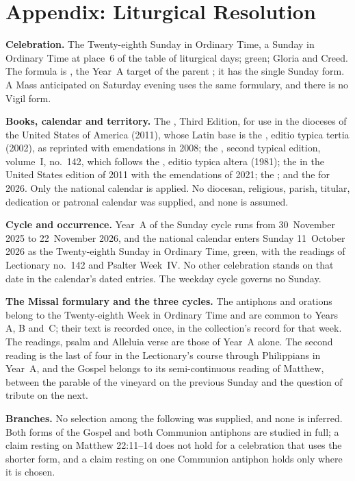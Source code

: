 \section{Appendix: Liturgical Resolution}
\label{sec:liturgical-resolution}

{\small
\textbf{Celebration.} The Twenty-eighth Sunday in Ordinary Time, a Sunday in
Ordinary Time at place~6 of the table of liturgical days; green; Gloria and
Creed. The formula is , the Year~A target of the parent
; it has the single Sunday form. A Mass anticipated on Saturday
evening uses the same formulary, and there is no Vigil form.

\textbf{Books, calendar and territory.} The , Third
Edition, for use in the dioceses of the United States of America (2011), whose
Latin base is the , editio typica tertia (2002), as
reprinted with emendations in 2008; the , second typical edition,
volume~I, no.~142, which follows the , editio
typica altera (1981); the  in the
United States edition of 2011 with the emendations of 2021; the
; and the
 for
2026. Only the national calendar is applied. No diocesan, religious, parish,
titular, dedication or patronal calendar was supplied, and none is assumed.

\textbf{Cycle and occurrence.} Year~A of the Sunday cycle runs from 30~November
2025 to 22~November 2026, and the national calendar enters Sunday 11~October
2026 as the Twenty-eighth Sunday in Ordinary Time, green, with the readings of
Lectionary no.~142 and Psalter Week~IV. No other celebration stands on that
date in the calendar's dated entries. The weekday cycle governs no Sunday.

\textbf{The Missal formulary and the three cycles.} The antiphons and orations
belong to the Twenty-eighth Week in Ordinary Time and are common to Years A, B
and~C; their text is recorded once, in the collection's record for that week.
The readings, psalm and Alleluia verse are those of Year~A alone. The second
reading is the last of four in the Lectionary's course through Philippians in
Year~A, and the Gospel belongs to its semi-continuous reading of Matthew,
between the parable of the vineyard on the previous Sunday and the question of
tribute on the next.

\textbf{Branches.} No selection among the following was supplied, and none is
inferred. Both forms of the Gospel and both Communion antiphons are studied in
full; a claim resting on Matthew 22:11--14 does not hold for a celebration
that uses the shorter form, and a claim resting on one Communion antiphon holds
only where it is chosen.
\par}

